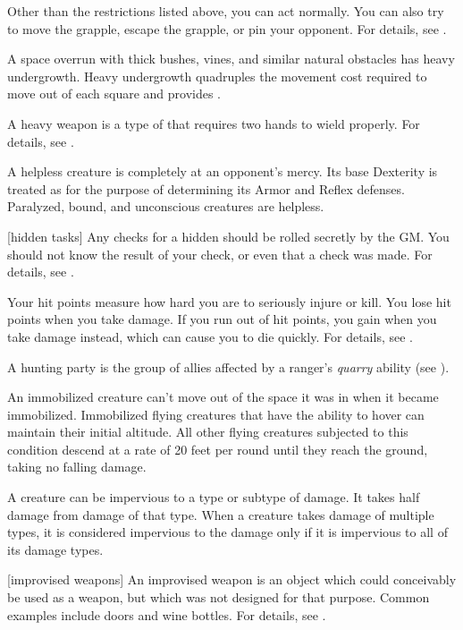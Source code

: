 Other than the restrictions listed above, you can act normally. You can also try to move the grapple, escape the grapple, or pin your opponent. For details, see .

 A space overrun with thick bushes, vines, and similar natural obstacles has heavy undergrowth.
Heavy undergrowth quadruples the movement cost required to move out of each square and provides .

 A heavy weapon is a type of  that requires two hands to wield properly.
For details, see .

 A helpless creature is completely at an opponent's mercy.
Its base Dexterity is treated as  for the purpose of determining its Armor and Reflex defenses.
Paralyzed, bound, and unconscious creatures are helpless.

[hidden tasks] Any checks for a hidden  should be rolled secretly by the GM.\@
You should not know the result of your check, or even that a check was made.
For details, see .

 Your hit points measure how hard you are to seriously injure or kill.
You lose hit points when you take damage.
If you run out of hit points, you gain  when you take damage instead, which can cause you to die quickly.
For details, see .

 A hunting party is the group of allies affected by a ranger's \textit{quarry} ability (see ).

 An immobilized creature can't move out of the space it was in when it became immobilized.
Immobilized flying creatures that have the ability to hover can maintain their initial altitude.
All other flying creatures subjected to this condition descend at a rate of 20 feet per round until they reach the ground, taking no falling damage.

 A creature can be impervious to a type or subtype of damage.
It takes half damage from damage of that type.
When a creature takes damage of multiple types, it is considered impervious to the damage only if it is impervious to all of its damage types.

[improvised weapons] An improvised weapon is an object which could conceivably be used as a weapon, but which was not designed for that purpose.
Common examples include doors and wine bottles.
For details, see .

